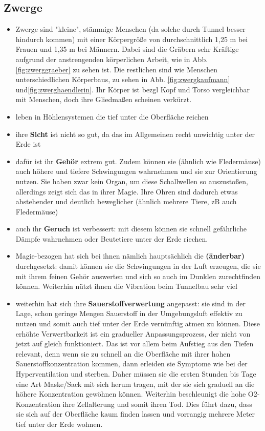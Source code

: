 \subsection{Zwerge} \label{rasse:zwerge}
\begin{itemize}
	\item  Zwerge sind "kleine", stämmige Menschen (da solche durch Tunnel besser hindurch kommen) mit einer Körpergröße von durchschnittlich 1,25 m bei Frauen und 1,35 m bei Männern. Dabei sind die Gräbern sehr Kräftige aufgrund der anstrengenden körperlichen Arbeit, wie in Abb. \ref{fig:zwerggraeber} zu sehen ist. Die restlichen sind wie Menschen unterschiedlichen Körperbaus, zu sehen in Abb. \ref{fig:zwergkaufmann} und\ref{fig:zwerghaendlerin}. Ihr Körper ist bezgl Kopf und Torso vergleichbar mit Menschen, doch ihre Gliedmaßen scheinen verkürzt.
	\item leben in Höhlensystemen die tief unter die Oberfläche reichen
	\item ihre \textbf{Sicht} ist nicht so gut, da das im Allgemeinen recht unwichtig unter der Erde ist
	\item dafür ist ihr \textbf{Gehör} extrem gut. Zudem können sie (ähnlich wie Fledermäuse) auch höhere und tiefere Schwingungen wahrnehmen und sie zur Orientierung nutzen. Sie haben zwar kein Organ, um diese Schallwellen so auszustoßen, allerdings zeigt sich das in ihrer Magie. Ihre Ohren sind dadurch etwas abstehender und deutlich beweglicher (ähnlich mehrere Tiere, zB auch Fledermäuse)
	\item auch ihr \textbf{Geruch} ist verbessert: mit diesem können sie schnell gefährliche Dämpfe wahrnehmen oder Beutetiere unter der Erde riechen.
	\item Magie-bezogen hat sich bei ihnen nämlich hauptsächlich die \textbf{ (änderbar)} durchgesetzt: damit können sie die Schwingungen in der Luft erzeugen, die sie mit ihrem feinen Gehör auswerten und sich so auch im Dunklen zurechtfinden können. Weiterhin nützt ihnen die Vibration beim Tunnelbau sehr viel
	\item weiterhin hat sich ihre \textbf{Sauerstoffverwertung} angepasst: sie sind in der Lage, schon geringe Mengen Sauerstoff in der Umgebungsluft effektiv zu nutzen und somit auch tief unter der Erde vernünftig atmen zu können. Diese erhöhte Verwertbarkeit ist ein gradueller Anpassungsprozess, der nicht von jetzt auf gleich funktioniert. Das ist vor allem beim Aufstieg aus den Tiefen relevant, denn wenn sie zu schnell an die Oberfläche mit ihrer hohen Sauerstoffkonzentration kommen, dann erleiden sie Symptome wie bei der Hyperventilation und sterben. Daher müssen sie die ersten Stunden bis Tage eine Art Maske/Sack mit sich herum tragen, mit der sie sich graduell an die höhere Konzentration gewöhnen können. Weiterhin beschleunigt die hohe O2-Konzentration ihre Zellalterung und somit ihren Tod. Dies führt dazu, dass sie sich auf der Oberfläche kaum finden lassen  und vorrangig mehrere Meter tief unter der Erde wohnen.
\end{itemize}

